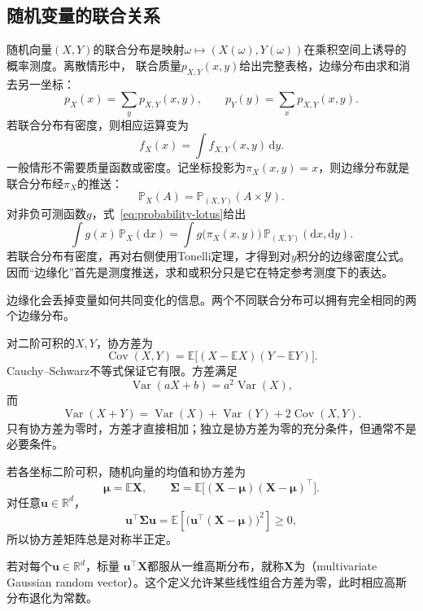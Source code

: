 \subsection{随机变量的联合关系}
\label{sec:rv-joint}
\label{sec:probability-joint-marginal-conditional}
随机向量\((X,Y)\)的联合分布是映射\(\omega\mapsto(X(\omega),Y(\omega))\)在乘积空间上诱导的概率测度。离散情形中，
联合质量\(p_{X,Y}(x,y)\)给出完整表格，边缘分布由求和消去另一坐标：
\[ p_X(x)=\sum_y p_{X,Y}(x,y),
  \qquad p_Y(y)=\sum_x p_{X,Y}(x,y). \]
若联合分布有密度，则相应运算变为
\[ f_X(x)=\int f_{X,Y}(x,y)\,\mathrm{d}y. \]
一般情形不需要质量函数或密度。记坐标投影为\(\pi_X(x,y)=x\)，则边缘分布就是联合分布经\(\pi_X\)的推送：
\[
  \mathbb{P}_X(A)
  =\mathbb{P}_{(X,Y)}(A\times\mathcal{Y}).
\]
对非负可测函数\(g\)，式~\eqref{eq:probability-lotus}给出
\[
  \int g(x)\,\mathbb{P}_X(\mathrm{d}x)
  =
  \int g\bigl(\pi_X(x,y)\bigr)\,
       \mathbb{P}_{(X,Y)}(\mathrm{d}x,\mathrm{d}y).
\]
若联合分布有密度，再对右侧使用Tonelli定理，才得到对\(y\)积分的边缘密度公式。因而“边缘化”首先是测度推送，求和或积分只是它在特定参考测度下的表达。

边缘化会丢掉变量如何共同变化的信息。两个不同联合分布可以拥有完全相同的两个边缘分布。

对二阶可积的\(X,Y\)，协方差为
\[ \operatorname{Cov}(X,Y)
  =\mathbb{E}\bigl[(X-\mathbb{E}X)(Y-\mathbb{E}Y)\bigr]. \]
Cauchy--Schwarz不等式保证它有限。方差满足
\[ \operatorname{Var}(aX+b)=a^2\operatorname{Var}(X), \]
而
\[ \operatorname{Var}(X+Y)
  =\operatorname{Var}(X)+\operatorname{Var}(Y)+2\operatorname{Cov}(X,Y). \]
只有协方差为零时，方差才直接相加；独立是协方差为零的充分条件，但通常不是必要条件。

若各坐标二阶可积，随机向量的均值和协方差为
\[ \bm{\mu}=\mathbb{E}\bm{X},
  \qquad\bm{\Sigma}=\mathbb{E}\bigl[(\bm{X}-\bm{\mu})(\bm{X}-\bm{\mu})^{\top}\bigr]. \]
对任意\(\bm{u}\in\mathbb{R}^d\)，
\[
  \bm{u}^{\top}\bm{\Sigma}\bm{u}
  =\mathbb{E}\left[
    \bigl(\bm{u}^{\top}(\bm{X}-\bm{\mu})\bigr)^2
  \right]\geq0,
\]
所以协方差矩阵总是对称半正定。
\begin{definition}[多元高斯随机向量]
  \label{def:probability-multivariate-gaussian}
  若对每个\(\bm{u}\in\mathbb{R}^d\)，标量
\(\bm{u}^{\top}\bm{X}\)都服从一维高斯分布，就称\(\bm{X}\)为（multivariate Gaussian random vector）。这个定义允许某些线性组合方差为零，此时相应高斯分布退化为常数。
\end{definition}


